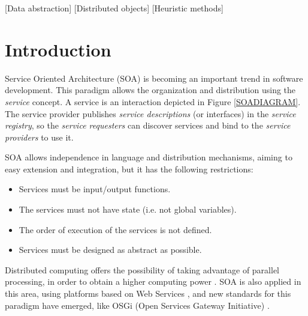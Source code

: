 \documentclass{sig-alternate}
\begin{document}
[Data abstraction]
[Distributed objects]
[Heuristic methods]





%
%
\section{Introduction}
\label{sec:intro}
%

Service Oriented Architecture (SOA) \cite{PAPAZOGLOU} is becoming an important trend in software development. This paradigm allows the organization and distribution using the {\em service} concept. A service is an interaction depicted in Figure \ref{SOADIAGRAM}. The service provider publishes {\em service descriptions} (or interfaces) in the {\em service registry}, so the {\em service requesters} can discover services and bind to the {\em service providers} to use it.

SOA allows independence in language and distribution mechanisms, aiming to easy extension and integration, but it has the following restrictions:

\begin{itemize}
\item Services must be input/output functions.
\item The services must not have state (i.e. not global variables).
\item The order of execution of the services is not defined.
\item Services must be designed as abstract as possible.
\end{itemize}

Distributed computing offers the possibility of taking advantage of parallel processing,
 in order to obtain a higher 
computing power \cite{OPENSCIENCEGRID}.
 SOA is also applied in this area, using platforms based on Web Services \cite{PAPAZOGLOU}, and new standards for this paradigm have emerged, like OSGi (Open Services Gateway Initiative) \cite{OSGI}.
\end{document}
